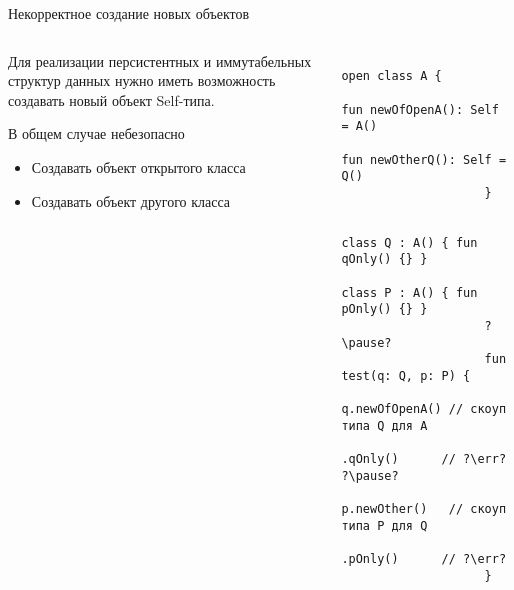 \documentclass[aspectratio=169,usenames,dvipsnames]{beamer}
\newcommand{\err}[0]{\textcolor{red}{ошибка}}
\begin{document}
    \begin{frame}[fragile]{Некорректное создание новых объектов}
        \begin{columns}[onlytextwidth]
            \begin{column}[t]{0.46\textwidth}
                \vspace{0.5em}

                Для реализации персистентных и иммутабельных структур данных нужно иметь возможность создавать новый объект Self-типа.

                \vspace{1em}
                \begin{block}{В общем случае небезопасно}
                    \begin{itemize}
                        \item Создавать объект открытого класса
                        \item Создавать объект другого класса
                    \end{itemize}
                \end{block}
            \end{column}\hfill%
            \begin{column}[t]{0.50\textwidth}
                \pause
                \begin{verbatim}
                    open class A {
                        fun newOfOpenA(): Self = A()
                        fun newOtherQ(): Self = Q()
                    }

                    class Q : A() { fun qOnly() {} }
                    class P : A() { fun pOnly() {} }
                    ?\pause?
                    fun test(q: Q, p: P) {
                        q.newOfOpenA() // скоуп типа Q для A
                         .qOnly()      // ?\err? ?\pause?
                        p.newOther()   // скоуп типа P для Q
                         .pOnly()      // ?\err?
                    }
                \end{verbatim}
            \end{column}
        \end{columns}
    \end{frame}
\end{document}
